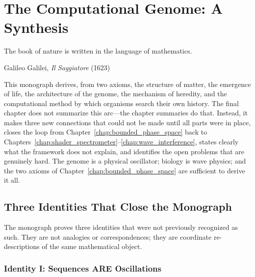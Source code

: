 
\chapter{The Computational Genome: A Synthesis}
\label{chap:synthesis}

\epigraph{%
  The book of nature is written in the language of mathematics.%
}{Galileo Galilei, \textit{Il Saggiatore} (1623)}

\begin{chapterbox}
This monograph derives, from two axioms, the structure of matter, the
emergence of life, the architecture of the genome, the mechanism of heredity,
and the computational method by which organisms search their own history. The
final chapter does not summarize this arc---the chapter summaries do that.
Instead, it makes three new connections that could not be made until all parts
were in place, closes the loop from Chapter~\ref{chap:bounded_phase_space} back
to Chapters~\ref{chap:shader_spectrometer}--\ref{chap:wave_interference},
states clearly what the framework does not explain, and identifies the open
problems that are genuinely hard. The genome is a physical oscillator; biology
is wave physics; and the two axioms of Chapter~\ref{chap:bounded_phase_space}
are sufficient to derive it all.
\end{chapterbox}

\section{Three Identities That Close the Monograph}
\label{sec:three_identities}

The monograph proves three identities that were not previously recognized as
such. They are not analogies or correspondences; they are coordinate
re-descriptions of the same mathematical object.

\subsection{Identity I: Sequences ARE Oscillations}
\label{subsec:identity_I}

